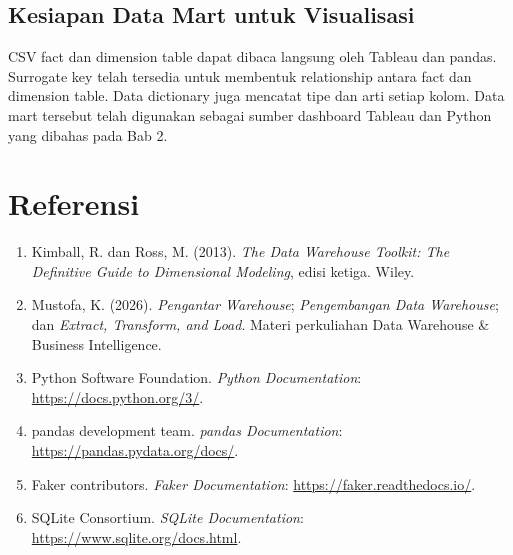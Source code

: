 \subsection{Kesiapan Data Mart untuk Visualisasi}

CSV fact dan dimension table dapat dibaca langsung oleh Tableau dan pandas.
Surrogate key telah tersedia untuk membentuk relationship antara fact dan
dimension table. Data dictionary juga mencatat tipe dan arti setiap kolom.
Data mart tersebut telah digunakan sebagai sumber dashboard Tableau dan Python
yang dibahas pada Bab 2.

\section{Referensi}

\begin{enumerate}
    \item Kimball, R. dan Ross, M. (2013). \textit{The Data Warehouse Toolkit:
    The Definitive Guide to Dimensional Modeling}, edisi ketiga. Wiley.
    \item Mustofa, K. (2026). \textit{Pengantar Warehouse};
    \textit{Pengembangan Data Warehouse}; dan \textit{Extract, Transform, and
    Load}. Materi perkuliahan Data Warehouse \& Business Intelligence.
    \item Python Software Foundation. \textit{Python Documentation}:
    \url{https://docs.python.org/3/}.
    \item pandas development team. \textit{pandas Documentation}:
    \url{https://pandas.pydata.org/docs/}.
    \item Faker contributors. \textit{Faker Documentation}:
    \url{https://faker.readthedocs.io/}.
    \item SQLite Consortium. \textit{SQLite Documentation}:
    \url{https://www.sqlite.org/docs.html}.
\end{enumerate}
